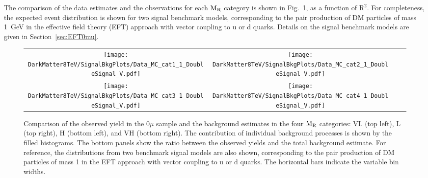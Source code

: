 {{The comparison of the data estimates and the observations for
each $\mathrm{M_{\rm R}}$ category is shown in
Fig.~\ref{fig:0muSignalBkg1GeV}, as a function of $\mathrm{R^2}$. For
completeness, the expected event distribution is shown for two signal
benchmark models, corresponding to the pair production of DM particles
of mass 1~GeV in the effective field theory (EFT) approach with vector coupling to u or d quarks. Details on the signal benchmark models are
given in Section~\ref{sec:EFT0mu}.


\begin{figure}[h!]
 \centering
 \begin{tabular}{cccc}
   \texttt{[image: DarkMatter8TeV/SignalBkgPlots/Data\_MC\_cat1\_1\_DoubleSignal\_V.pdf]}  & 
   \texttt{[image: DarkMatter8TeV/SignalBkgPlots/Data\_MC\_cat2\_1\_DoubleSignal\_V.pdf]} \\ 
   \texttt{[image: DarkMatter8TeV/SignalBkgPlots/Data\_MC\_cat3\_1\_DoubleSignal\_V.pdf]}  & 
   \texttt{[image: DarkMatter8TeV/SignalBkgPlots/Data\_MC\_cat4\_1\_DoubleSignal\_V.pdf]}\\
 \end{tabular}
 \caption{Comparison of the observed yield in the $0\mu$ sample and the
   background estimates in the four $\mathrm{M_{\rm R}}$ categories:
   VL (top left), L (top right), H (bottom left), and VH (bottom right). The
   contribution of individual background processes is shown by the
   filled histograms. The bottom panels show the ratio
   between the observed yields and the total background estimate. For reference, the distributions from two
   benchmark signal models are also shown, corresponding to the pair
   production of DM particles of mass 1 \GeV in the EFT approach with
   vector coupling to u or d quarks. The horizontal bars indicate 
the variable bin widths.\label{fig:0muSignalBkg1GeV} }
\end{figure}

}}

